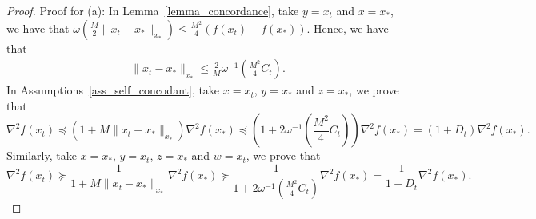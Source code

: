 \documentclass[10pt,a4paper]{amsart}
\begin{document}
\begin{proof}

    Proof for (a): In Lemma~\ref{lemma_concordance}, take $y = x_t$ and $x = x_*$, we have that $\omega(\frac{M}{2}\|x_t - x_*\|_{x_*}) \leq \frac{M^2}{4}(f(x_t) - f(x_*))$. Hence, we have that
    \begin{align*}
        \|x_t - x_*\|_{x_*} \leq \frac{2}{M}\omega^{-1}(\frac{M^2}{4}C_t).
    \end{align*}
    In Assumptions~\ref{ass_self_concodant}, take $x = x_t$, $y = x_*$ and $z = x_*$, we prove that 
    \begin{equation}
        \nabla^2{f(x_t)} \preceq (1 + M\|x_t - x_*\|_{x_*})\nabla^2{f(x_*)} \preceq (1 + 2\omega^{-1}(\frac{M^2}{4}C_t))\nabla^2{f(x_*)} = (1 + D_t)\nabla^2{f(x_*)}.
    \end{equation}
    Similarly, take $x = x_*$, $y = x_t$, $z = x_*$ and $w = x_t$, we prove that 
    \begin{equation}
        \nabla^2{f(x_t)} \succeq \frac{1}{1 + M\|x_t - x_*\|_{x_*}}\nabla^2{f(x_*)} \succeq \frac{1}{1 + 2\omega^{-1}(\frac{M^2}{4}C_t)}\nabla^2{f(x_*)} = \frac{1}{1 + D_t}\nabla^2{f(x_*)}.
    \end{equation}


\end{proof}
\end{document}

